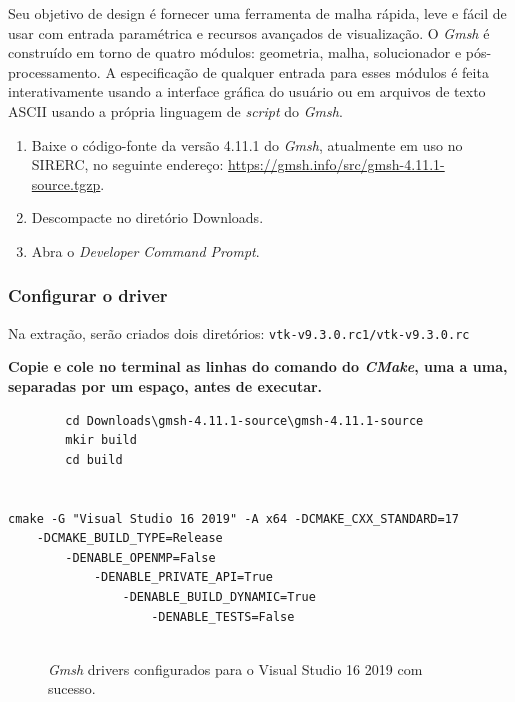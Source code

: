 \documentclass[a4paper,11pt]{article}
\newcommand{\sistema}{\textsf{SIRERC}}
\newcommand{\cmake}{\textit{CMake}}
\newcommand{\gmsh}{\textit{Gmsh}}
\newcommand{\cautionbox}[1]{
	\vskip 5mm
	\begin{leftbar}
		\textbf{#1}
	\end{leftbar}
	\vskip 5mm
}
\begin{document}
Seu objetivo de design é fornecer uma ferramenta de malha rápida, leve e fácil de usar com entrada paramétrica e recursos avançados de visualização. O \gmsh{} é construído em torno de quatro módulos: geometria, malha, solucionador e pós-processamento. A especificação de qualquer entrada para esses módulos é feita interativamente usando a interface gráfica do usuário ou em arquivos de texto ASCII usando a própria linguagem de \textit{script} do \gmsh{}.

\begin{enumerate}
	\item Baixe o código-fonte da versão 4.11.1 do \gmsh{}, atualmente em uso no \sistema{}, no seguinte endereço: \url{https://gmsh.info/src/gmsh-4.11.1-source.tgzp}.
	\item Descompacte no diretório Downloads.
	\item Abra o \textit{Developer Command Prompt}.
\end{enumerate}

\subsubsection{Configurar o driver}

Na extração, serão criados dois diretórios: {\tt vtk-v9.3.0.rc1/vtk-v9.3.0.rc}

\cautionbox{
Copie e cole no terminal as linhas do comando do \cmake{}, uma a uma, separadas por um espaço, antes de executar.
}
\begin{mdframed}
	\begin{verbatim}
		cd Downloads\gmsh-4.11.1-source\gmsh-4.11.1-source
		mkir build
		cd build
		

cmake -G "Visual Studio 16 2019" -A x64 -DCMAKE_CXX_STANDARD=17
	-DCMAKE_BUILD_TYPE=Release
		-DENABLE_OPENMP=False
			-DENABLE_PRIVATE_API=True
				-DENABLE_BUILD_DYNAMIC=True
					-DENABLE_TESTS=False
		
	\end{verbatim}
\end{mdframed}


\begin{figure}[H]
	\centering
	\caption{\gmsh{} drivers configurados para o Visual Studio 16 2019 com sucesso.}
	\label{fig:gmsh_build}
\end{figure}
\end{document}

